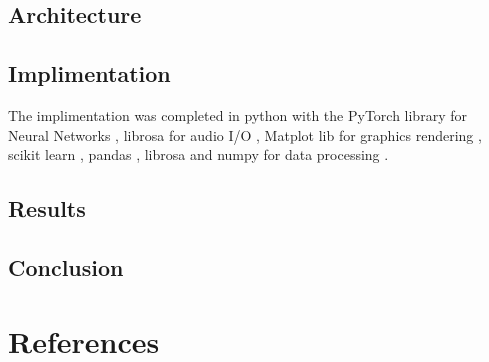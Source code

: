 \documentclass{article}
\begin{document}
\subsection{Architecture}
\label{sec:arch}
\subsection{Implimentation}
The implimentation was completed in python with the PyTorch library for Neural Networks \cite{NEURIPS2019_9015}, librosa for audio I/O \cite{mcfee2015librosa}, Matplot lib for graphics rendering \cite{Hunter:2007}, scikit learn \cite{scikit-learn}, pandas \cite{reback2020pandas} \cite{mckinney-proc-scipy-2010}, librosa \cite{mcfee2015librosa} and numpy \cite{harris2020array} for data processing \cite{fma_dataset}\cite{fma_challenge}.
\label{sec:impl}
\subsection{Results}
\label{sec:results}
\subsection{Conclusion}
\label{sec:conclusion}

\section{References}
\printbibliography[heading=bibintoc]
\end{document}
